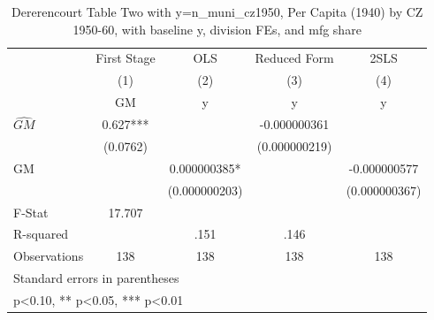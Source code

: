 \begin{table}[htbp]\centering
\def\sym#1{\ifmmode^{#1}\else\(^{#1}\)\fi}
\caption{Dererencourt Table Two with y=n\_muni\_cz1950, Per Capita (1940) by CZ 1950-60, with baseline y, division FEs, and mfg share}
\begin{tabular}{l*{4}{c}}
\toprule
                    & First Stage   &         OLS   &Reduced Form   &        2SLS   \\
                    &\multicolumn{1}{c}{(1)}&\multicolumn{1}{c}{(2)}&\multicolumn{1}{c}{(3)}&\multicolumn{1}{c}{(4)}\\
                    &\multicolumn{1}{c}{GM}&\multicolumn{1}{c}{y}&\multicolumn{1}{c}{y}&\multicolumn{1}{c}{y}\\
\midrule
$\hat{GM}$          &       0.627***&               &-0.000000361   &               \\
                    &    (0.0762)   &               &(0.000000219)   &               \\
\addlinespace
GM                  &               & 0.000000385*  &               &-0.000000577   \\
                    &               &(0.000000203)   &               &(0.000000367)   \\
\midrule
F-Stat              &      17.707   &               &               &               \\
R-squared           &               &        .151   &        .146   &               \\
Observations        &         138   &         138   &         138   &         138   \\
\bottomrule
\multicolumn{5}{l}{\footnotesize Standard errors in parentheses}\\
\multicolumn{5}{l}{\footnotesize * p<0.10, ** p<0.05, *** p<0.01}\\
\end{tabular}
\end{table}
